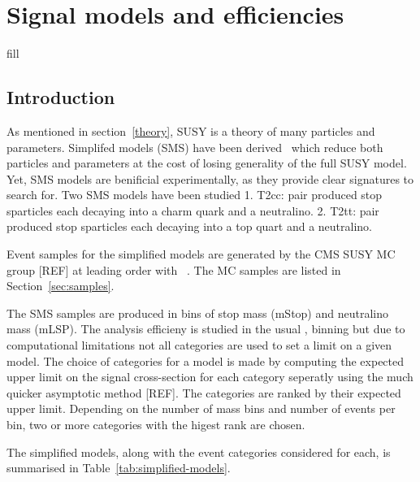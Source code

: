\clearpage
\section{Signal models and efficiencies\label{sec:signal}}

fill 

\subsection{Introduction}

As mentioned in section~\ref{theory}, SUSY is a theory of many particles
and parameters.  Simplifed models (SMS) have been derived~\cite{Alwall:2008ag,Alwall:2008va,sms}
which reduce both particles and parameters at the cost of losing 
generality of the full SUSY model. Yet, SMS models are benificial experimentally,
as they provide clear signatures to search for.  Two SMS models have been studied
1. T2cc: pair produced stop sparticles each decaying into a charm quark and a neutralino.
2. T2tt: pair produced stop sparticles each decaying into a top quart and a neutralino.

Event samples for the simplified models are generated by the CMS SUSY MC group
[REF] at leading order with \MADGRAPH~\cite{madgraph}. %
The MC samples are listed in Section~\ref{sec:samples}.

The SMS samples are produced in bins of stop mass (mStop) and neutralino
mass (mLSP). The analysis efficieny is studied in the usual \njet, \nb binning
but due to computational limitations not all categories are used to set 
a limit on a given model. The choice of categories for a model is made by
computing the expected upper limit on the signal cross-section for each
category seperatly using the much quicker asymptotic method [REF]. The categories
are ranked by their expected upper limit. Depending on the number of 
mass bins and number of events per bin, two or more categories with the 
higest rank are chosen.

The simplified models, along with the event categories considered for each,
is summarised in Table~\ref{tab:simplified-models}.


